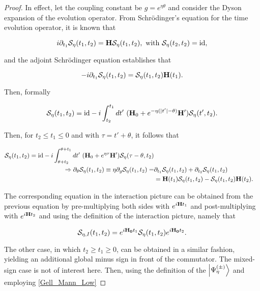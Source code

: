 \begin{proof}

In effect, let the coupling constant be $g = e^{\eta \theta}$ and consider the Dyson expansion of the evolution operator. From Schr\"odinger's equation for the time evolution operator, it is known that 

$$
    i \partial_{t_1} \mathcal{S}_{\eta}(t_1,t_2) = {\bf H} \mathcal{S}_{\eta}(t_1,t_2), \textnormal{ with } \mathcal{S}_{\eta}(t_2,t_2) = \textnormal{id}, 
$$

and the adjoint Schr\"odinger equation establishes that 

$$
-i \partial_{t_1} \mathcal{S}_{\eta}(t_1,t_2) = \mathcal{S}_{\eta}(t_1,t_2) {\bf H}(t_1). 
$$

Then, formally 

$$
    \mathcal{S}_{\eta}(t_1,t_2) = \textnormal{id} - i \int_{t_2}^{t_1}dt' \textnormal{ } ({\bf H}_0 + e^{-\eta (|t'| - \theta)} {\bf H}') \mathcal{S}_{\eta}(t',t_2).
$$


Then, for $t_2 \leq t_1 \leq 0$ and with $\tau = t' + \theta$, it follows that 

\begin{equation}
    \begin{split}
        \mathcal{S}_{\eta}(t_1,t_2) = \textnormal{id} - i \int_{\theta + t_2}^{\theta + t_1}dt' \textnormal{ } ({\bf H}_0 + e^{\eta \tau} {\bf H}') \mathcal{S}_{\eta}(\tau - \theta,t_2) \\
        \Rightarrow \partial_{\theta} \mathcal{S}_{\eta}(t_1,t_2) \equiv \eta \partial_{g} \mathcal{S}_{\eta}(t_1,t_2) =& \partial_{t_1} \mathcal{S}_{\eta}(t_1,t_2) + \partial_{t_2}\mathcal{S}_{\eta}(t_1,t_2) \\
        &= {\bf H}(t_1) \mathcal{S}_{\eta}(t_1,t_2) - \mathcal{S}_{\eta}(t_1,t_2) {\bf H}(t_2).
    \end{split}
    \label{Gell_Mann_Low}
\end{equation}

The corresponding equation in the interaction picture can be obtained from the previous equation by pre-multiplying both sides with $e^{i {\bf H} t_1}$ and post-multiplying with $e^{i {\bf H} t_2}$ and using the definition of the interaction picture, namely that 

$$
    \mathcal{S}_{\eta, I}(t_1,t_2) = e^{i {\bf H_0} t_1} \mathcal{S}_{\eta}(t_1,t_2) e^{i {\bf H_0} t_2}. 
$$

The other case, in which $t_2 \geq t_1 \geq 0$, can be obtained in a similar fashion, yielding an additional global minus sign in front of the commutator. The mixed-sign case is not of interest here. Then, using the definition of the $\ket{\Psi_{\eta}^{(\pm)}}$ and employing \cref{Gell_Mann_Low}


\end{proof}
